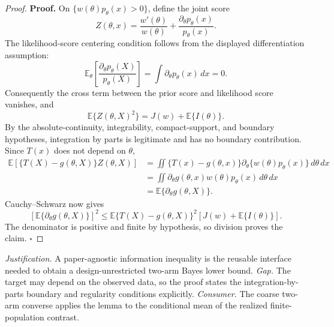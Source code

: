 \documentclass{article}
\begin{document}
\begin{proof}
\textbf{Proof.}
On \(\{w(\theta)p_\theta(x)>0\}\), define the joint score
\[
 Z(\theta,x)=\frac{w'(\theta)}{w(\theta)}+
 \frac{\partial_\theta p_\theta(x)}{p_\theta(x)}.
\]
The likelihood-score centering condition follows from the displayed differentiation assumption:
\[
 \mathbb E_\theta\!\left[
 \frac{\partial_\theta p_\theta(X)}{p_\theta(X)}
 \right]
 =\int\partial_\theta p_\theta(x)\,dx=0.
\]
Consequently the cross term between the prior score and likelihood score vanishes, and
\[
 \mathbb E\{Z(\theta,X)^2\}
 =J(w)+\mathbb E\{I(\theta)\}.
\]
By the absolute-continuity, integrability, compact-support, and boundary hypotheses, integration by parts is legitimate and has no boundary contribution. Since \(T(x)\) does not depend on \(\theta\),
\[
 \begin{aligned}
 \mathbb E[\{T(X)-g(\theta,X)\}Z(\theta,X)]
 &=\iint \{T(x)-g(\theta,x)\}
 \partial_\theta\{w(\theta)p_\theta(x)\}\,d\theta\,dx\\
 &=\iint \partial_\theta g(\theta,x)
 w(\theta)p_\theta(x)\,d\theta\,dx\\
 &=\mathbb E\{\partial_\theta g(\theta,X)\}.
 \end{aligned}
\]
Cauchy--Schwarz now gives
\[
 \left[\mathbb E\{\partial_\theta g(\theta,X)\}\right]^2
 \leq \mathbb E\{T(X)-g(\theta,X)\}^2
 \left[J(w)+\mathbb E\{I(\theta)\}\right].
\]
The denominator is positive and finite by hypothesis, so division proves the claim. \(\square\)
\end{proof}
\par\smallskip\noindent \textit{Justification.} A paper-agnostic information inequality is the reusable interface needed to obtain a design-unrestricted two-arm Bayes lower bound. \textit{Gap.} The target may depend on the observed data, so the proof states the integration-by-parts boundary and regularity conditions explicitly. \textit{Consumer.} The coarse two-arm converse applies the lemma to the conditional mean of the realized finite-population contrast.
\end{document}
